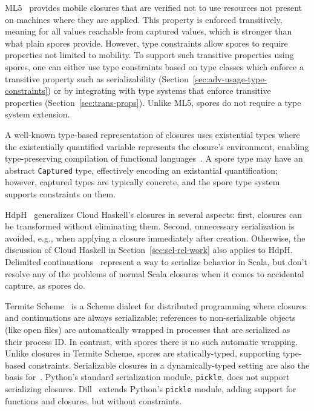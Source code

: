 \documentclass[runningheads]{llncs}
\begin{document}
\begin{sloppypar}
ML5~\cite{MurphyML5} provides mobile closures that are verified not to use
resources not present on machines where they are applied. This property is
enforced transitively, meaning for all values reachable from captured values,
which is stronger than what plain spores provide. However, type constraints
allow spores to require properties not limited to mobility. To support such
transitive properties using spores, one can either use type constraints based
on type classes which enforce a transitive property such as serializability
(Section~\ref{sec:adv-usage-type-constraints}) or by integrating with type
systems that enforce transitive properties (Section~\ref{sec:trans-props}). Unlike ML5, spores
do not require a type system extension.

A well-known type-based representation of closures uses existential types
where the existentially quantified variable represents the closure's environment,
enabling type-preserving
compilation of functional languages~\cite{MorrisettWCG99}. A spore type
may have an abstract \verb|Captured| type, effectively encoding an existantial quantification; however,
captured types are typically concrete, and the spore type system supports constraints on them.

HdpH~\cite{HDPH} generalizes Cloud Haskell's closures in several aspects:
first, closures can be transformed without eliminating them. Second,
unnecessary serialization is avoided, e.g., when applying a closure
immediately after creation. Otherwise, the discussion of Cloud Haskell in
Section~\ref{sec:sel-rel-work} also applies to HdpH. Delimited
continuations~\cite{DelimitedContinuations} represent a way to serialize
behavior in Scala, but don't resolve any of the problems of normal Scala
closures when it comes to accidental capture, as spores do.

Termite Scheme~\cite{Termite} is a Scheme dialect for distributed programming
where closures and continuations are
always serializable; references to non-serializable objects (like open
files) are automatically wrapped in processes that are
serialized as their process ID. In contrast, with spores there is no such
automatic wrapping. Unlike closures in Termite Scheme, spores are statically-typed,
supporting type-based constraints. Serializable closures in a
dynamically-typed setting are also the basis for~\cite{DFPS}. Python's
standard serialization module, \verb|pickle|, does not support serializing
closures. Dill~\cite{dill} extends Python's \verb|pickle| module, adding
support for functions and closures, but without constraints.



\end{sloppypar}
\end{document}
